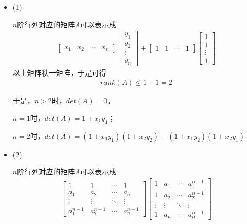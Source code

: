 \documentclass{article}
\begin{document}
\begin{itemize}
  \item (1)

        $n$阶行列对应的矩阵$A$可以表示成
        \begin{align*}
          \begin{bmatrix}
            x_1 & x_2 & \cdots & x_n
          \end{bmatrix}
          \begin{bmatrix}
            y_1    \\
            y_2    \\
            \vdots \\
            y_n
          \end{bmatrix}
          + \begin{bmatrix}
              1 & 1 & \cdots & 1
            \end{bmatrix}
          \begin{bmatrix}
            1      \\
            1      \\
            \vdots \\
            1
          \end{bmatrix}
        \end{align*}
        以上矩阵秩一矩阵，于是可得
        \begin{align*}
          rank(A) \leq 1 + 1 = 2
        \end{align*}

        于是，$n > 2$时，$det(A) = 0$。

        $n = 1$时，$det(A) = 1 + x_1y_1$；

        $n = 2$时，$det(A) = (1 + x_1y_1)(1 + x_2y_2) - (1 + x_1y_2)(1 + x_2y_1)$

  \item (2)

        $n$阶行列对应的矩阵$A$可以表示成
        \begin{align*}
          \begin{bmatrix}
            1           & 1           & \cdots & 1           \\
            a_1         & a_2         & \cdots & a_n         \\
            \vdots      & \vdots      & \ddots & \vdots      \\
            a_1^{n - 1} & a_2^{n - 1} & \cdots & a_n^{n - 1}
          \end{bmatrix}
          \begin{bmatrix}
            1      & a_1    & \cdots & a_1^{n - 1} \\
            1      & a_2    & \cdots & a_2^{n - 1} \\
            \vdots & \vdots & \ddots & \vdots      \\
            1      & a_n    & \cdots & a_n^{n - 1}
          \end{bmatrix}
        \end{align*}


\end{itemize}
\end{document}
